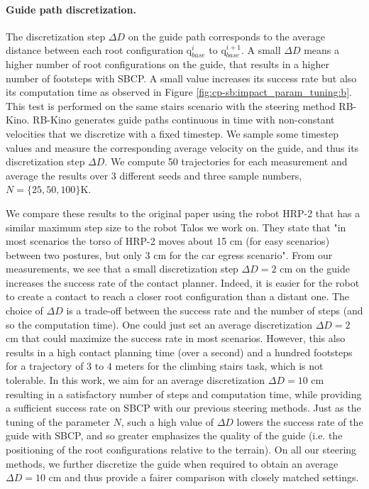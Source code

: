 \paragraph{Guide path discretization.}
The discretization step $\Delta D$ on the guide path corresponds to the average distance between each root configuration q$_{base}^i$ to q$_{base}^{i+1}$. A small $\Delta D$ means a higher number of root configurations on the guide, that results in a higher number of footsteps with SBCP. 
A small value increases its success rate but also its computation time as observed in Figure \ref{fig:cp-sb:impact_param_tuning:b}.
This test is performed on the same stairs scenario with the steering method RB-Kino. 
RB-Kino generates guide paths continuous in time with non-constant velocities that
we discretize with a fixed timestep. 
We sample some timestep values and measure the corresponding average velocity on the guide, and thus its discretization step $\Delta D$.
We compute 50 trajectories for each measurement and average the results over 3 different seeds and three sample numbers, $N=\{25,50,100\}$K. 

We compare these results to the original paper \cite{AcyclicCP} using the robot HRP-2 that has a similar maximum step size to the robot Talos we work on. They state that "in most scenarios the torso of HRP-2 moves about 15 cm (for easy scenarios) between two postures, but only 3 cm for the car egress scenario". 
From our measurements, we see that a small discretization step $\Delta D=2$ cm on the guide increases the success rate of the contact planner. 
Indeed, it is easier for the robot to create a contact to reach a closer root configuration than a distant one.
The choice of $\Delta D$ is a trade-off between the success rate and the number of steps (and so the computation time). 
One could just set an average discretization $\Delta D=2$ cm that could maximize the success rate in most scenarios. However, this also results in a high contact planning time (over a second) and a hundred footsteps for a trajectory of $3$ to $4$ meters for the climbing stairs task, which is not tolerable.
In this work, we aim for an average discretization $\Delta D=10$ cm resulting in a satisfactory number of steps and computation time, while providing a sufficient success rate on SBCP with our previous steering methods. 
Just as the tuning of the parameter $N$, such a high value of $\Delta D$ lowers the success rate of the guide with SBCP, and so greater emphasizes the quality of the guide (i.e. the positioning of the root configurations relative to the terrain).
On all our steering methods, we further discretize the guide when required to obtain an average $\Delta D=10$ cm and thus provide a fairer comparison with closely matched settings.

